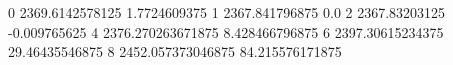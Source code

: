 0 2369.6142578125 1.7724609375
1 2367.841796875 0.0
2 2367.83203125 -0.009765625
4 2376.270263671875 8.428466796875
6 2397.30615234375 29.46435546875
8 2452.057373046875 84.215576171875
